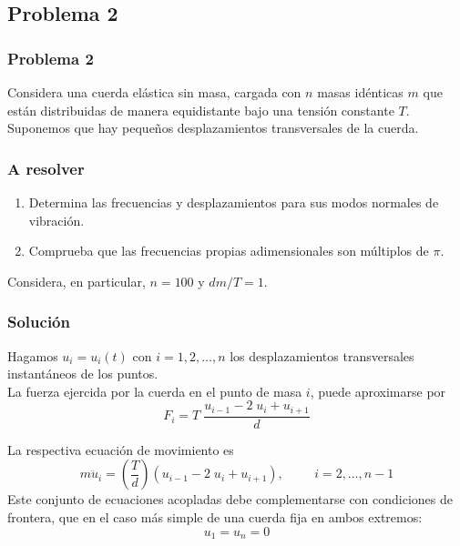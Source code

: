 %	
\subsection{Problema 2}
\begin{frame}
\frametitle{Problema 2}
Considera una cuerda elástica sin masa, cargada con $n$ masas idénticas $m$ que están distribuidas de manera equidistante  bajo una tensión constante $T$.
\\
\bigskip
Suponemos que hay pequeños desplazamientos transversales de la cuerda.
\end{frame}
\begin{frame}
\frametitle{A resolver}
\begin{enumerate}
\item Determina las frecuencias y desplazamientos para sus modos normales de vibración. 
\item Comprueba que las frecuencias propias adimensionales son múltiplos de $\pi$.
\end{enumerate}
Considera, en particular, $n = 100$ y $dm / T = 1$.
\end{frame}
\begin{frame}
\frametitle{Solución}
Hagamos $u_{i} = u_{i}(t)$ con $i = 1, 2, \ldots, n$ los desplazamientos transversales instantáneos de los puntos.
\\
\bigskip
La fuerza ejercida por la cuerda en el punto de masa $i$, puede aproximarse por
\[ F_{i} = T \; \dfrac{u_{i-1} - 2 \; u_{i} + u_{i+1}}{d} \]
\end{frame}
\begin{frame}
La respectiva ecuación de movimiento es
\[ m \ddot{u}_{i}  = \left( \dfrac{T}{d} \right) (u_{i-1} - 2 \; u_{i} + u_{i+1}), \hspace{1cm} i = 2, \ldots, n-1  \]
\pause
Este conjunto de ecuaciones acopladas debe complementarse con condiciones de frontera, que en el caso más simple de una cuerda fija en ambos extremos:
\[ u_{1} = u_{n} = 0 \]
\end{frame}

